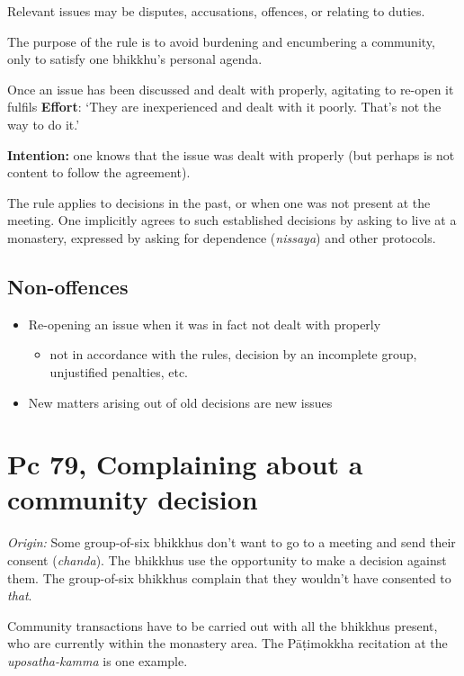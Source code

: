Relevant issues may be disputes, accusations, offences, or relating to
duties.

The purpose of the rule is to avoid burdening and encumbering a
community, only to satisfy one bhikkhu's personal agenda.

Once an issue has been discussed and dealt with properly, agitating to
re-open it fulfils \textbf{Effort}: `They are inexperienced and dealt
with it poorly. That's not the way to do it.'

\textbf{Intention:} one knows that the issue was dealt with properly
(but perhaps is not content to follow the agreement).

The rule applies to decisions in the past, or when one was not present
at the meeting. One implicitly agrees to such established decisions by
asking to live at a monastery, expressed by asking for dependence
(\emph{nissaya}) and other protocols.

\subsection{Non-offences}

\begin{itemize}
\tightlist
\item
  Re-opening an issue when it was in fact not dealt with properly

  \begin{itemize}
  \tightlist
  \item
    not in accordance with the rules, decision by an incomplete group,
    unjustified penalties, etc.
  \end{itemize}
\item
  New matters arising out of old decisions are new issues
\end{itemize}

\section{Pc 79, Complaining about a community decision}

\emph{Origin:} Some group-of-six bhikkhus don't want to go to a meeting
and send their consent (\emph{chanda}). The bhikkhus use the opportunity
to make a decision against them. The group-of-six bhikkhus complain that
they wouldn't have consented to \emph{that}.

Community transactions have to be carried out with all the bhikkhus
present, who are currently within the monastery area. The Pāṭimokkha
recitation at the \emph{uposatha-kamma} is one example.

